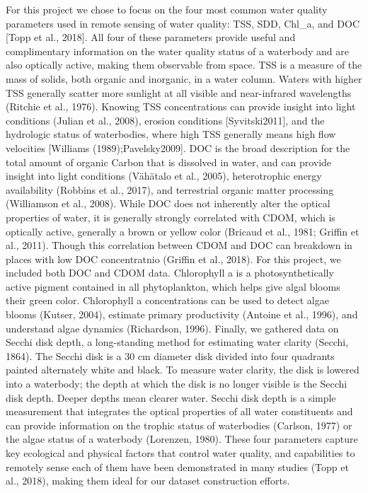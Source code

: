 \documentclass[]{article}
\begin{document}
For this project we chose to focus on the four most common water quality
parameters used in remote sensing of water quality: TSS, SDD, Chl\_a,
and DOC {[}Topp et al., 2018{]}. All four of these parameters provide
useful and complimentary information on the water quality status of a
waterbody and are also optically active, making them observable from
space. TSS is a measure of the mass of solids, both organic and
inorganic, in a water column. Waters with higher TSS generally scatter
more sunlight at all visible and near-infrared wavelengths (Ritchie et
al., 1976). Knowing TSS concentrations can provide insight into light
conditions (Julian et al., 2008), erosion conditions {[}Syvitski2011{]},
and the hydrologic status of waterbodies, where high TSS generally means
high flow velocities {[}Williams (1989);Pavelsky2009{]}. DOC is the
broad description for the total amount of organic Carbon that is
dissolved in water, and can provide insight into light conditions
(Vähätalo et al., 2005), heterotrophic energy availability (Robbins et
al., 2017), and terrestrial organic matter processing (Williamson et
al., 2008). While DOC does not inherently alter the optical properties
of water, it is generally strongly correlated with CDOM, which is
optically active, generally a brown or yellow color (Bricaud et al.,
1981; Griffin et al., 2011). Though this correlation between CDOM and
DOC can breakdown in places with low DOC concentratnio (Griffin et al.,
2018). For this project, we included both DOC and CDOM data. Chlorophyll
a is a photosynthetically active pigment contained in all phytoplankton,
which helps give algal blooms their green color. Chlorophyll a
concentrations can be used to detect algae blooms (Kutser, 2004),
estimate primary productivity (Antoine et al., 1996), and understand
algae dynamics (Richardson, 1996). Finally, we gathered data on Secchi
disk depth, a long-standing method for estimating water clarity (Secchi,
1864). The Secchi disk is a 30 cm diameter disk divided into four
quadrants painted alternately white and black. To measure water clarity,
the disk is lowered into a waterbody; the depth at which the disk is no
longer visible is the Secchi disk depth. Deeper depths mean clearer
water. Secchi disk depth is a simple measurement that integrates the
optical properties of all water constituents and can provide information
on the trophic status of waterbodies (Carlson, 1977) or the algae status
of a waterbody (Lorenzen, 1980). These four parameters capture key
ecological and physical factors that control water quality, and
capabilities to remotely sense each of them have been demonstrated in
many studies (Topp et al., 2018), making them ideal for our dataset
construction efforts.
\end{document}
